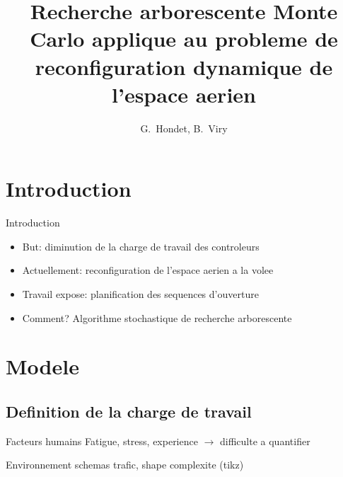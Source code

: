 \documentclass[tikz]{beamer}
\title[Reconfiguration par Monte Carlo]{%
  Recherche arborescente Monte Carlo applique au probleme de reconfiguration
  dynamique de l'espace aerien
}
\author[Hondet, Viry]{G.~Hondet, B.~Viry}
\begin{document}
\begin{frame}
  \titlepage{}
\end{frame}


\section*{Introduction}

\begin{frame}[c]{Introduction}
  \begin{itemize}
    \item But: diminution de la charge de travail des controleurs
    \item Actuellement: reconfiguration de l'espace aerien a la volee
    \item Travail expose: planification des sequences d'ouverture
    \item Comment? Algorithme stochastique de recherche arborescente
  \end{itemize}
\end{frame}

\section{Modele}
\subsection{Definition de la charge de travail}
\begin{frame}
  \begin{block}{Facteurs humains}
    Fatigue, stress, experience \(\longrightarrow\) difficulte a quantifier
  \end{block}
  \begin{block}{Environnement}
    schemas trafic, shape complexite (tikz)
  \end{block}
\end{frame}
\end{document}
